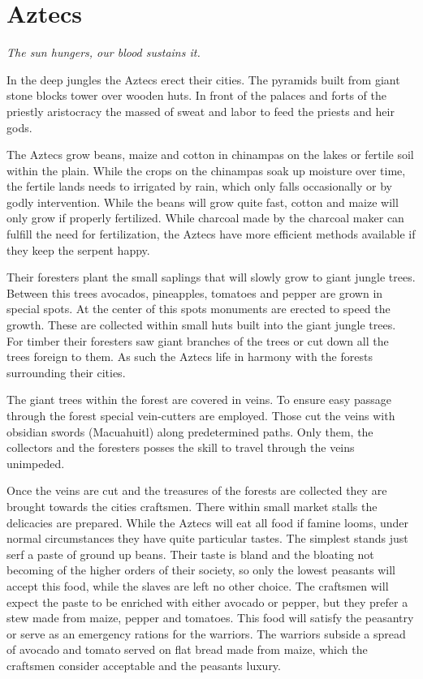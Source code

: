 \section{\Gls{Aztecs}}

\begin{flushright}
	\emph{The sun hungers, our blood sustains it.}
\end{flushright}

In the deep jungles the \gls{Aztecs} erect their cities. The pyramids built
from giant stone blocks tower over wooden huts. In front of the palaces and
forts of the priestly aristocracy the massed of sweat and labor to feed the
priests and heir gods.

The \gls{Aztecs} grow beans, maize and cotton in chinampas on the lakes or
fertile soil within the plain. While the crops on the chinampas soak up
moisture over time, the fertile lands needs to irrigated by rain, which only
falls occasionally or by godly intervention. While the beans will grow quite
fast, cotton and maize will only grow if properly fertilized. While charcoal
made by the charcoal maker can fulfill the need for fertilization, the
\gls{Aztecs} have more efficient methods available if they keep the serpent
happy.

Their foresters plant the small saplings that will slowly grow to giant jungle
trees. Between this trees avocados, pineapples, tomatoes and pepper are grown
in special spots. At the center of this spots monuments are erected to speed
the growth. These are collected within small huts built into the giant jungle
trees. For timber their foresters saw giant branches of the trees or cut down
all the trees foreign to them. As such the \gls{Aztecs} life in harmony with
the forests surrounding their cities.

The giant trees within the forest are covered in veins. To ensure easy passage
through the forest special vein-cutters are employed. Those cut the veins with
obsidian swords (Macuahuitl) along predetermined paths. Only them, the
collectors and the foresters posses the skill to travel through the veins
unimpeded.

Once the veins are cut and the treasures of the forests are collected they are
brought towards the cities craftsmen. There within small market stalls the
delicacies are prepared. While the \gls{Aztecs} will eat all food if famine
looms, under normal circumstances they have quite particular tastes. The
simplest stands just serf a paste of ground up beans. Their taste is bland and
the bloating not becoming of the higher orders of their society, so only the
lowest peasants will accept this food, while the slaves are left no other
choice. The craftsmen will expect the paste to be enriched with either avocado
or pepper, but they prefer a stew made from maize, pepper and tomatoes. This
food will satisfy the peasantry or serve as an emergency rations for the
warriors. The warriors subside a spread of avocado and tomato served on flat
bread made from maize, which the craftsmen consider acceptable and the peasants
luxury.

